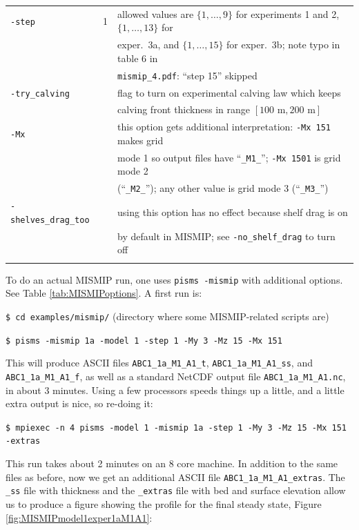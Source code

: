 \documentclass[11pt,final]{amsart}
\begin{document}
\begin{table}[ht]
\begin{tabular}{@{}lll}
\verb|-step| & 1 & allowed values are $\{1,\dots,9\}$ for experiments 1 and 2, $\{1,\dots,13\}$ for \\
             &  & exper.~3a, and $\{1,\dots,15\}$ for exper.~3b; note typo in table 6 in  \\
             &  & \verb|mismip_4.pdf|: ``step 15'' skipped \\
\verb|-try_calving| &  & flag to turn on experimental calving law which keeps  \\
                    &  & calving front thickness in range $[100\text{ m},200\text{ m}]$ \\
\hline
\verb|-Mx| &  & this option gets additional interpretation: \verb|-Mx 151| makes grid \\
           &  & mode 1 so output files have ``\verb|_M1_|''; \verb|-Mx 1501| is grid mode 2 \\
           &  & (``\verb|_M2_|''); any other value is grid mode 3 (``\verb|_M3_|'') \\
\verb|-shelves_drag_too| &  & using this option has no effect because shelf drag is on \\
                         &  & by default in MISMIP; see \verb|-no_shelf_drag| to turn off  \\
\hline\normalsize
\end{tabular}\end{table}

To do an actual MISMIP run, one uses \verb|pisms -mismip| with additional options.  See Table \ref{tab:MISMIPoptions}.  A first run is:

\verb|$ cd examples/mismip/|  \hfill \scriptsize(directory where some MISMIP-related scripts are)\normalsize

\verb|$ pisms -mismip 1a -model 1 -step 1 -My 3 -Mz 15 -Mx 151|

\noindent This will produce ASCII files \verb|ABC1_1a_M1_A1_t|, \verb|ABC1_1a_M1_A1_ss|, and \verb|ABC1_1a_M1_A1_f|, as well as a standard NetCDF output file \verb|ABC1_1a_M1_A1.nc|, in about 3 minutes.  Using a few processors speeds things up a little, and a little extra output is nice, so re-doing it:

\verb|$ mpiexec -n 4 pisms -model 1 -mismip 1a -step 1 -My 3 -Mz 15 -Mx 151 -extras|

\noindent This run takes about 2 minutes on an 8 core machine.  In addition to the same files as before, now we get an additional ASCII file \verb|ABC1_1a_M1_A1_extras|.  The \verb|_ss| file with thickness and the \verb|_extras| file with bed and surface elevation allow us to produce a figure showing the profile for the final steady state, Figure \ref{fig:MISMIPmodel1exper1aM1A1}:
\end{document}
